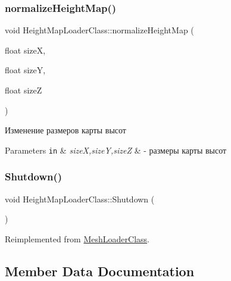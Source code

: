 \subsubsection{\texorpdfstring{normalize\+Height\+Map()}{normalizeHeightMap()}}
{\footnotesize\ttfamily void Height\+Map\+Loader\+Class\+::normalize\+Height\+Map (\begin{DoxyParamCaption}\item[{float}]{sizeX,  }\item[{float}]{sizeY,  }\item[{float}]{sizeZ }\end{DoxyParamCaption})\hspace{0.3cm}{\ttfamily [private]}}



Изменение размеров карты высот 


\begin{DoxyParams}[1]{Parameters}
\mbox{\tt in}  & {\em sizeX,sizeY,sizeZ} & -\/ размеры карты высот \\
\hline
\end{DoxyParams}
\mbox{\label{class_height_map_loader_class_a7d0685c6784bb9c525085a87fcecae0b}} 
\subsubsection{\texorpdfstring{Shutdown()}{Shutdown()}}
{\footnotesize\ttfamily void Height\+Map\+Loader\+Class\+::\+Shutdown (\begin{DoxyParamCaption}{ }\end{DoxyParamCaption})\hspace{0.3cm}{\ttfamily [virtual]}}



Reimplemented from \hyperlink{class_mesh_loader_class_a7d91e4ba3144e686c1215ad161d5a6b0}{Mesh\+Loader\+Class}.



\subsection{Member Data Documentation}
\mbox{\label{class_mesh_loader_class_a295180d6e2a2d0df952c53da7098ec20}} 
